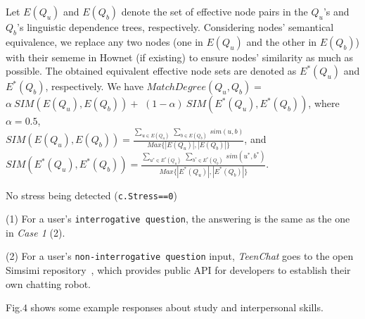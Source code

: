 Let $E(Q_u)$ and $E(Q_b)$ denote the set of effective node pairs in the $Q_u$'s and $Q_b$'s linguistic dependence trees, respectively.
Considering nodes' semantical equivalence, we replace any two nodes (one in $E(Q_u)$ and the other in $E(Q_b)$) with their
sememe in Hownet (if existing) to ensure nodes' similarity as much as possible. The obtained equivalent effective node sets are denoted as $E^*(Q_u)$ and $E^*(Q_b)$, respectively.
We have
$MatchDegree(Q_u,Q_b)=$
$\alpha ~ SIM(E(Q_u),E(Q_b))+$
$(1-\alpha) ~ SIM(E^*(Q_u),E^*(Q_b))$,
where $\alpha=0.5$,\\
$SIM(E(Q_u),E(Q_b))=\frac{\sum_{u \in E(Q_u)}~\sum_{b \in E(Q_b)}~sim(u,b)}{Max \{|E(Q_u)|, |E(Q_b)|\}}$, and \\
$SIM(E^*(Q_u),E^*(Q_b))=\frac{\sum_{u^* \in E^*(Q_u)}~\sum_{b^* \in E^*(Q_b)}~sim(u^*,b^*)}{Max \{|E^*(Q_u)|, |E^*(Q_b)|\}}$.

 No stress being detected (\texttt{c.Stress==0})

\noindent (1) For a user's \texttt{interrogative question}, the answering is the same as the one in \emph{Case 1} (2).

\noindent (2) For a user's \texttt{non-interrogative question} input, \emph{TeenChat} goes to the open Simsimi repository~\cite{30SIMSIMI}, which provides public API for developers to establish their own chatting robot.

Fig.$4$ shows some example responses about study and interpersonal skills.

